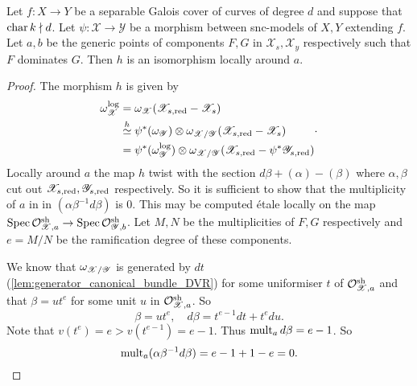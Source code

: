 \begin{proposition}\label{prop:pullback_log_canonincal}
	Let $f: X \to Y$ be a separable Galois cover of curves of degree $d$ and suppose that  $\operatorname{char} k \nmid d$. 
	Let $\psi: \mathscr X \to \mathscr Y$ be a morphism between snc-models of $X, Y$ extending  $f$.
	Let $a, b$ be the generic points of components $F, G$ in $\mathscr X_s, \mathscr X_y$ respectively such that $F$ dominates $G$. 
	Then $h$ is an isomorphism locally around $a$. 
\end{proposition}
\begin{proof}
	The morphism $h$ is given by 
	\[
	\begin{aligned}
		\omega_{\mathscr X}^{\text{log}} &= \omega_{\mathscr{X}}(\mathscr{X}_{s, \text{red}} - \mathscr{X}_s) \\
						 &\overset h\simeq \psi^*(\omega_{\mathscr{Y}}) \otimes \omega_{\mathscr{X} / \mathscr{Y}} (\mathscr{X}_{s, \text{red}} - \mathscr{X}_s) \\
						 &= \psi^*(\omega_{\mathscr{Y}}^{\text{log}}) \otimes \omega_{\mathscr X / \mathscr{Y}}(\mathscr{X} _{s, \text{red}} - \psi^*\mathscr{Y}_{s, \text{red}}) \\
	\end{aligned}
	.\] 
	Locally around $a$ the map $h$ twist with the section $d\beta + (\alpha) - (\beta)$ where $\alpha, \beta$ cut out $\mathscr{X}_{s, \text{red}}, \mathscr{Y}_{s, \text{red}} $ respectively. 
	So it is sufficient to show that the multiplicity of $a$ in in $(\alpha \beta^{-1}d\beta)$ is $0$.  
	This may be computed étale locally on the map $\operatorname{Spec} \mathcal{O}_{\mathscr{X}, a}^{\text{sh}} \to \operatorname{Spec} \mathcal{O}^{\text{sh}}_{\mathscr{Y}, b}$. 
	Let $M, N$ be the multiplicities of $F, G$ respectively and $e = M / N$ be the ramification degree of these components. 

	We know that $\omega_{\mathscr{X} / \mathscr{Y}}$ is generated by $d t$ (\cref{lem:generator_canonical_bundle_DVR}) for some uniformiser $t$ of $\mathcal{O}_{\mathscr{X}, a}^{\text{sh}}$ and that $\beta = u t ^{e} $ for some unit $u$ in $\mathcal{O}_{\mathscr{X}, a}^{\text{sh}}$. 
	So \[
		\beta = u {t}^{e},\quad d\beta = {t}^{e-1}dt + {t} ^{e} du
	.\]  
	Note that $v({t} ^{e}) = e > v({t}^{e-1}) = e -1$. 
	Thus $\operatorname{mult}_{a} d\beta = e - 1$. 
	So \[
		\operatorname{mult}_a (\alpha \beta^{-1} d\beta) = e - 1 + 1 - e = 0
	.\]
\end{proof}

